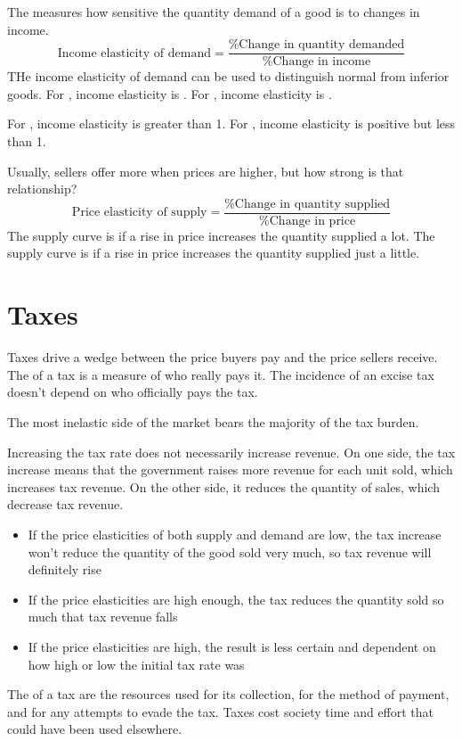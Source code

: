 \documentclass{article}
\begin{document}
The  measures how sensitive the quantity demand of a good is to changes in income. $$\textrm{Income elasticity of demand} = \frac{\textrm{\% Change in quantity demanded}}{{\% \textrm{Change in income}}}$$ THe income elasticity of demand can be used to distinguish normal from inferior goods. For , income elasticity is . For , income elasticity is . 

\begin{remark}
  For , income elasticity is greater than 1. For , income elasticity is positive but less than 1. 
\end{remark}

Usually, sellers offer more when prices are higher, but how strong is that relationship? $$\textrm{Price elasticity of supply} = \frac{\textrm{\% Change in quantity supplied}}{\% \textrm{Change in price}}$$ The supply curve is  if a rise in price increases the quantity supplied a lot. The supply curve is  if a rise in price increases the quantity supplied just a little. 

\section{Taxes}

Taxes drive a wedge between the price buyers pay and the price sellers receive. The  of a tax is a measure of who really pays it. The incidence of an excise tax doesn't depend on who officially pays the tax. 

\begin{remark}
  The most inelastic side of the market bears the majority of the tax burden.
\end{remark}

Increasing the tax rate does not necessarily increase revenue. On one side, the tax increase means that the government raises more revenue for each unit sold, which increases tax revenue. On the other side, it reduces the quantity of sales, which decrease tax revenue. 
\begin{itemize}
  \item If the price elasticities of both supply and demand are low, the tax increase won't reduce the quantity of the good sold very much, so tax revenue will definitely rise 
  \item If the price elasticities are high enough, the tax reduces the quantity sold so much that tax revenue falls 
  \item If the price elasticities are high, the result is less certain and dependent on how high or low the initial tax rate was
\end{itemize}
The  of a tax are the resources used for its collection, for the method of payment, and for any attempts to evade the tax. Taxes cost society time and effort that could have been used elsewhere. \\ 
\end{document}
